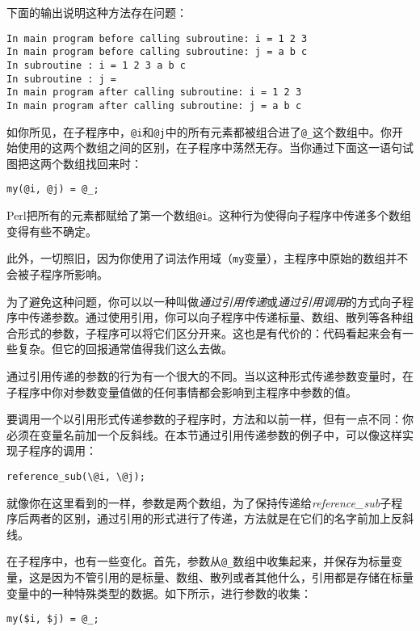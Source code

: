 下面的输出说明这种方法存在问题：

\begin{lstlisting}
In main program before calling subroutine: i = 1 2 3
In main program before calling subroutine: j = a b c
In subroutine : i = 1 2 3 a b c
In subroutine : j = 
In main program after calling subroutine: i = 1 2 3
In main program after calling subroutine: j = a b c
\end{lstlisting}

如你所见，在子程序中，\verb|@i|和\verb|@j|中的所有元素都被组合进了\verb|@_|这个数组中。你开始使用的这两个数组之间的区别，在子程序中荡然无存。当你通过下面这一语句试图把这两个数组找回来时：

\begin{lstlisting}
my(@i, @j) = @_;
\end{lstlisting}

Perl把所有的元素都赋给了第一个数组\verb|@i|。这种行为使得向子程序中传递多个数组变得有些不确定。

此外，一切照旧，因为你使用了词法作用域（\verb|my|变量），主程序中原始的数组并不会被子程序所影响。

为了避免这种问题，你可以以一种叫做\textit{通过引用传递}或\textit{通过引用调用}的方式向子程序中传递参数。通过使用引用，你可以向子程序中传递标量、数组、散列等各种组合形式的参数，子程序可以将它们区分开来。这也是有代价的：代码看起来会有一些复杂。但它的回报通常值得我们这么去做。

通过引用传递的参数的行为有一个很大的不同。当以这种形式传递参数变量时，在子程序中你对参数变量值做的任何事情都会影响到主程序中参数的值。

要调用一个以引用形式传递参数的子程序时，方法和以前一样，但有一点不同：你必须在变量名前加一个反斜线。在本节通过引用传递参数的例子中，可以像这样实现子程序的调用：

\begin{lstlisting}
reference_sub(\@i, \@j);
\end{lstlisting}

就像你在这里看到的一样，参数是两个数组，为了保持传递给\textit{reference\_sub}子程序后两者的区别，通过引用的形式进行了传递，方法就是在它们的名字前加上反斜线。

在子程序中，也有一些变化。首先，参数从\verb|@_|数组中收集起来，并保存为标量变量，这是因为不管引用的是标量、数组、散列或者其他什么，引用都是存储在标量变量中的一种特殊类型的数据。如下所示，进行参数的收集：

\begin{lstlisting}
my($i, $j) = @_;
\end{lstlisting}


